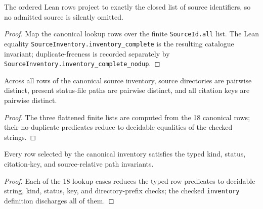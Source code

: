 \begin{theorem}
  \label{thm:source-inventory-complete}
  \leanok
  The ordered Lean rows project to exactly the closed list of source
  identifiers, so no admitted source is silently omitted.
\end{theorem}

\begin{proof}
  Map the canonical lookup rows over the finite \texttt{SourceId.all} list.
  The Lean equality \texttt{SourceInventory.inventory\_complete} is the
  resulting catalogue invariant; duplicate-freeness is recorded separately by
  \texttt{SourceInventory.inventory\_complete\_nodup}.
  \leanok
\end{proof}

\begin{theorem}
  \label{thm:source-inventory-globally-valid}
  \leanok
  Across all rows of the canonical source inventory, source directories are
  pairwise distinct, present status-file paths are pairwise distinct, and all
  citation keys are pairwise distinct.
\end{theorem}

\begin{proof}
  The three flattened finite lists are computed from the 18 canonical rows;
  their no-duplicate predicates reduce to decidable equalities of the checked
  strings.
  \leanok
\end{proof}

\begin{theorem}
  \label{thm:source-inventory-valid}
  \leanok
  Every row selected by the canonical inventory satisfies the typed kind,
  status, citation-key, and source-relative path invariants.
\end{theorem}

\begin{proof}
  Each of the 18 lookup cases reduces the typed row predicates to decidable
  string, kind, status, key, and directory-prefix checks; the checked
  \texttt{inventory} definition discharges all of them.
  \leanok
\end{proof}

